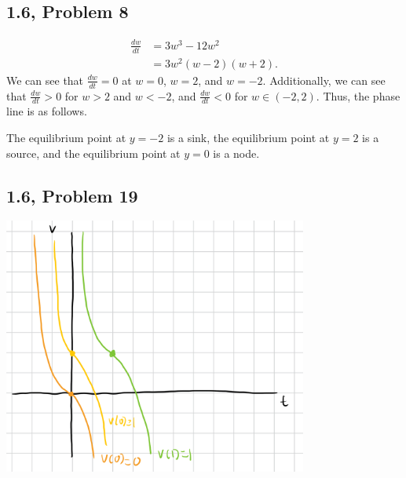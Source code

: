 \documentclass[10pt]{mypackage}
\begin{document}
\subsection{1.6, Problem 8}%
\begin{align*}
  \frac{dw}{dt} &= 3w^3 - 12w^2\\
                &= 3w^2 \left(w-2\right)\left(w+2\right).
\end{align*}
We can see that $\frac{dw}{dt} = 0$ at $w = 0$, $w = 2$, and $w = -2$. Additionally, we can see that $\frac{dw}{dt} > 0$ for $w > 2$ and $w < -2$, and $\frac{dw}{dt} < 0$ for $w\in (-2,2)$. Thus, the phase line is as follows.
\begin{center}
\end{center}
The equilibrium point at $y=-2$ is a sink, the equilibrium point at $y=2$ is a source, and the equilibrium point at $y=0$ is a node.
\subsection{1.6, Problem 19}%
\begin{center}
  \includegraphics[width=10cm]{images/1_6_19.png}
\end{center}
\end{document}
